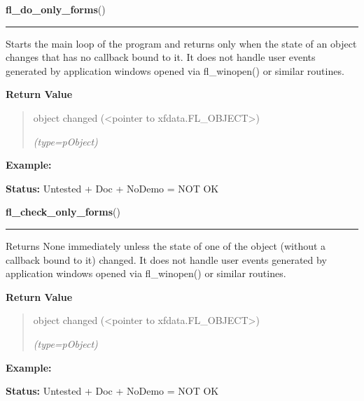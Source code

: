 \hspace{.8\funcindent}\begin{boxedminipage}{\funcwidth}

    \raggedright \textbf{fl\_do\_only\_forms}()

    \vspace{-1.5ex}

    \rule{\textwidth}{0.5\fboxrule}
\setlength{\parskip}{2ex}
    Starts the main loop of the program and returns only when the state of 
    an object changes that has no callback bound to it. It does not handle 
    user events generated by application windows opened via fl\_winopen() 
    or similar routines.

\setlength{\parskip}{1ex}
      \textbf{Return Value}
    \vspace{-1ex}

      \begin{quote}
      object changed ({\textless}pointer to 
      xfdata.FL\_OBJECT{\textgreater})

      {\it (type=pObject)}

      \end{quote}

\textbf{Example:} 

\textbf{Status:} Untested + Doc + NoDemo = NOT OK



    \end{boxedminipage}

    \label{xformslib:library:fl_check_only_forms}

    \vspace{0.5ex}

\hspace{.8\funcindent}\begin{boxedminipage}{\funcwidth}

    \raggedright \textbf{fl\_check\_only\_forms}()

    \vspace{-1.5ex}

    \rule{\textwidth}{0.5\fboxrule}
\setlength{\parskip}{2ex}
    Returns None immediately unless the state of one of the object (without
    a callback bound to it) changed. It does not handle user events 
    generated by application windows opened via fl\_winopen() or similar 
    routines.

\setlength{\parskip}{1ex}
      \textbf{Return Value}
    \vspace{-1ex}

      \begin{quote}
      object changed ({\textless}pointer to 
      xfdata.FL\_OBJECT{\textgreater})

      {\it (type=pObject)}

      \end{quote}

\textbf{Example:} 

\textbf{Status:} Untested + Doc + NoDemo = NOT OK



    \end{boxedminipage}

